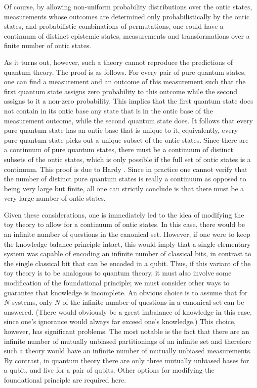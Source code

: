 \documentclass[pra,twocolumn,nofootinbib,showpacs]{revtex4}
\begin{document}
Of course, by allowing non-uniform probability distributions over
the ontic states, measurements whose outcomes are determined only
probabilistically by the ontic states, and probabilistic
combinations of permutations, one could have a continuum of
distinct epistemic states, measurements and transformations over a
finite number of ontic states.

As it turns out, however, such a theory cannot reproduce the
predictions of quantum theory. The proof is as follows. For every
pair of pure quantum states, one can find a measurement and an
outcome of this measurement such that the first quantum state
assigns zero probability to this outcome while the second assigns
to it a non-zero probability. This implies that the first quantum
state does not contain in its ontic base any state that is in the
ontic base of the measurement outcome, while the second quantum
state does. It follows that every pure quantum state has an ontic
base that is unique to it, equivalently, every pure quantum state
picks out a unique subset of the ontic states. Since there are a
continuum of pure quantum states, there must be a continuum of
distinct subsets of the ontic states, which is only possible if
the full set
of ontic states is a continuum. This proof is due to Hardy \cite%
{Hardydiscomfort}. Since in practice one cannot verify that the number of
distinct pure quantum states is really a continuum as opposed to being very
large but finite, all one can strictly conclude is that there must be a very
large number of ontic states.

Given these considerations, one is immediately led to the idea of modifying
the toy theory to allow for a continuum of ontic states. In this case, there
would be an infinite number of questions in the canonical set. However, if
one were to keep the knowledge balance principle intact, this would imply
that a single elementary system was capable of encoding an infinite number
of classical bits, in contrast to the single classical bit that can be
encoded in a qubit. Thus, if this variant of the toy theory is to be
analogous to quantum theory, it must also involve some modification of the
foundational principle; we must consider other ways to guarantee that
knowledge is incomplete. An obvious choice is to assume that for $N$
systems, only $N$ of the infinite number of questions in a canonical set can
be answered. (There would obviously be a great imbalance of knowledge in
this case, since one's ignorance would always far exceed one's knowledge.)
This choice, however, has significant problems. The most notable is the fact
that there are an infinite number of mutually unbiased partitionings of an
infinite set and therefore such a theory would have an infinite number of
mutually unbiased measurements. By contrast, in quantum theory there are
only three mutually unbiased bases for a qubit, and five for a pair of
qubits. Other options for modifying the foundational principle are required
here.
\end{document}
